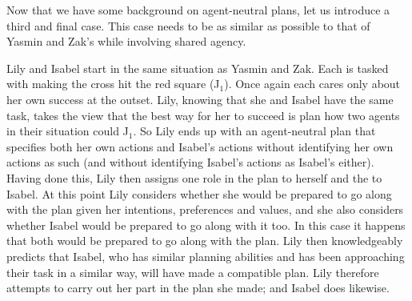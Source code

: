 \documentclass[12pt,\papersize]{extarticle}
\begin{document}
Now that we have some background on agent-neutral plans,
let us introduce a third and final case.
This case needs to be as similar as possible to that of Yasmin and Zak's while involving shared agency.

Lily and Isabel start in the same situation as Yasmin and Zak. 
Each is tasked with making the cross hit the red square (J$_1$). 
Once again each cares only about her own success at the outset. 
Lily, knowing that she and Isabel have the same task, takes the view that the best way for her to succeed is plan how two agents in their situation could J$_1$.  
So Lily ends up with an agent-neutral plan that specifies both her own actions and Isabel's actions without identifying her own actions as such (and without identifying Isabel's actions as Isabel's either).
Having done this, Lily then assigns one role in the plan to herself and the to Isabel.
At this point Lily considers whether she would be prepared to go along with the plan given her intentions, preferences and values, and she also considers whether Isabel would be prepared to go along with it too. 
In this case it happens that both would be prepared to go along with the plan.
Lily then knowledgeably predicts that Isabel, who has similar planning abilities and has been approaching their task in a similar way, will have made a compatible plan.
Lily therefore attempts to carry out her part in the plan she made; and Isabel does likewise.
\end{document}
